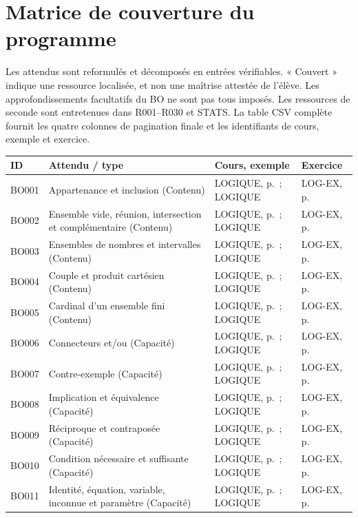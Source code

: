\chapter{Matrice de couverture du programme}\label{MATRICE}
Les attendus sont reformulés et décomposés en entrées vérifiables. « Couvert » indique une ressource localisée, et non une maîtrise attestée de l’élève. Les approfondissements facultatifs du BO ne sont pas tous imposés. Les ressources de seconde sont entretenues dans R001–R030 et STATS. La table CSV complète fournit les quatre colonnes de pagination finale et les identifiants de cours, exemple et exercice.
\small\begin{longtable}{p{.1\linewidth}p{.43\linewidth}p{.19\linewidth}p{.16\linewidth}}\toprule ID & Attendu / type & Cours, exemple & Exercice \\\midrule\endhead
BO001 & Appartenance et inclusion (Contenu) & LOGIQUE, p.\,\pageref{LOGIQUE} ; LOGIQUE & LOG-EX, p.\,\pageref{LOG-EX} \\
BO002 & Ensemble vide, réunion, intersection et complémentaire (Contenu) & LOGIQUE, p.\,\pageref{LOGIQUE} ; LOGIQUE & LOG-EX, p.\,\pageref{LOG-EX} \\
BO003 & Ensembles de nombres et intervalles (Contenu) & LOGIQUE, p.\,\pageref{LOGIQUE} ; LOGIQUE & LOG-EX, p.\,\pageref{LOG-EX} \\
BO004 & Couple et produit cartésien (Contenu) & LOGIQUE, p.\,\pageref{LOGIQUE} ; LOGIQUE & LOG-EX, p.\,\pageref{LOG-EX} \\
BO005 & Cardinal d’un ensemble fini (Contenu) & LOGIQUE, p.\,\pageref{LOGIQUE} ; LOGIQUE & LOG-EX, p.\,\pageref{LOG-EX} \\
BO006 & Connecteurs et/ou (Capacité) & LOGIQUE, p.\,\pageref{LOGIQUE} ; LOGIQUE & LOG-EX, p.\,\pageref{LOG-EX} \\
BO007 & Contre-exemple (Capacité) & LOGIQUE, p.\,\pageref{LOGIQUE} ; LOGIQUE & LOG-EX, p.\,\pageref{LOG-EX} \\
BO008 & Implication et équivalence (Capacité) & LOGIQUE, p.\,\pageref{LOGIQUE} ; LOGIQUE & LOG-EX, p.\,\pageref{LOG-EX} \\
BO009 & Réciproque et contraposée (Capacité) & LOGIQUE, p.\,\pageref{LOGIQUE} ; LOGIQUE & LOG-EX, p.\,\pageref{LOG-EX} \\
BO010 & Condition nécessaire et suffisante (Capacité) & LOGIQUE, p.\,\pageref{LOGIQUE} ; LOGIQUE & LOG-EX, p.\,\pageref{LOG-EX} \\
BO011 & Identité, équation, variable, inconnue et paramètre (Capacité) & LOGIQUE, p.\,\pageref{LOGIQUE} ; LOGIQUE & LOG-EX, p.\,\pageref{LOG-EX} \\

\end{longtable}
